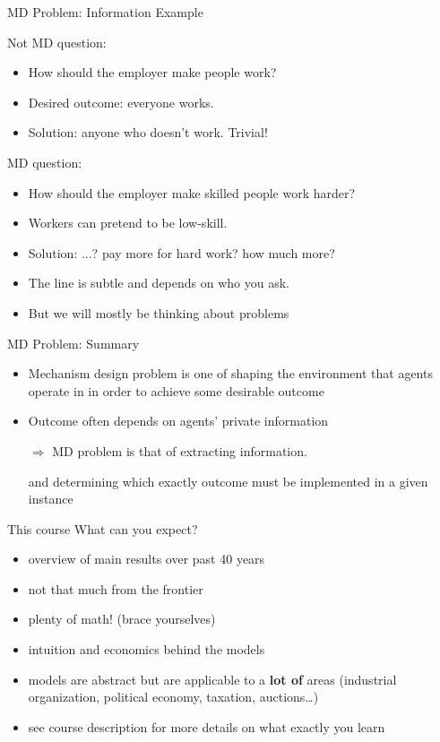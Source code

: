 \documentclass[english,10pt
,aspectratio=169
]{beamer}
\begin{document}
\begin{frame}{MD Problem: Information Example}
\begin{exampleblock}{Not MD question:}
	\begin{itemize}
		\item How should the employer \alert<1>{make people work}?
		\item Desired outcome: everyone works.
		\item Solution:  anyone who doesn't work. Trivial!
	\end{itemize}
\end{exampleblock}
\pause
\begin{exampleblock}{MD question:}
	\begin{itemize}
		\item How should the employer \alert<2>{make skilled people work harder}?
		\item Workers can pretend to be low-skill.
		\item Solution: ...? pay more for hard work? how much more?
	\end{itemize}
\end{exampleblock}
\pause
\begin{itemize}
	\item The line is subtle and depends on who you ask.
	\item But we will mostly be thinking about  problems
\end{itemize}
\end{frame}


\begin{frame}{MD Problem: Summary}
\begin{itemize}
	\item Mechanism design problem is one of shaping the environment that agents operate in in order to achieve some desirable outcome
	\item Outcome often depends on agents' private information 
	
	$\Rightarrow$ MD problem is that of extracting information.
	
	and determining which exactly outcome must be implemented in a given instance
\end{itemize}
\end{frame}


\begin{frame}{This course}
	What can you expect?
	\begin{itemize}
		\item overview of main results over past 40 years
		\item not that much from the frontier
		\item plenty of math! (brace yourselves)
		\item intuition and economics behind the models
		\item models are abstract but are applicable to a \textbf{lot of} areas (industrial organization, political economy, taxation, auctions\ldots{})
		\item see course description for more details on what exactly you learn
	\end{itemize}
\end{frame}
\end{document}
